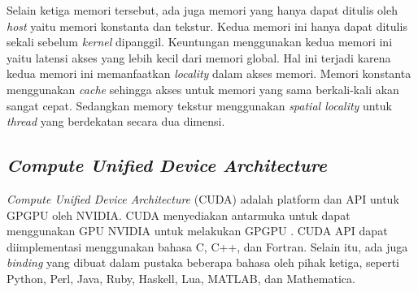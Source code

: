 
    Selain ketiga memori tersebut, ada juga memori yang hanya dapat ditulis oleh \emph{host} yaitu memori konstanta dan tekstur. Kedua memori ini hanya dapat ditulis sekali sebelum \emph{kernel} dipanggil. Keuntungan menggunakan kedua memori ini yaitu latensi akses yang lebih kecil dari memori global. Hal ini terjadi karena kedua memori ini memanfaatkan \emph{locality} dalam akses memori. Memori konstanta menggunakan \emph{cache} sehingga akses untuk memori yang sama berkali-kali akan sangat cepat. Sedangkan memory tekstur menggunakan \emph{spatial locality} untuk \emph{thread} yang berdekatan secara dua dimensi.

  
  
  
  \subsection{\emph{Compute Unified Device Architecture}}
  
    \emph{Compute Unified Device Architecture} (CUDA) adalah platform dan API untuk GPGPU oleh NVIDIA. CUDA menyediakan antarmuka untuk dapat menggunakan GPU NVIDIA untuk melakukan GPGPU \citep{cuda}. CUDA API dapat diimplementasi menggunakan bahasa C, C++, dan Fortran. Selain itu, ada juga \emph{binding} yang dibuat dalam pustaka beberapa bahasa oleh pihak ketiga, seperti Python, Perl, Java, Ruby, Haskell, Lua, MATLAB, dan Mathematica.
    
